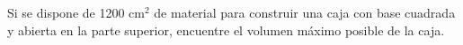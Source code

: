\item Si se dispone de 1200 cm$^2$ de material para construir una caja con base cuadrada y abierta en la parte superior, encuentre el volumen máximo posible de la caja.
